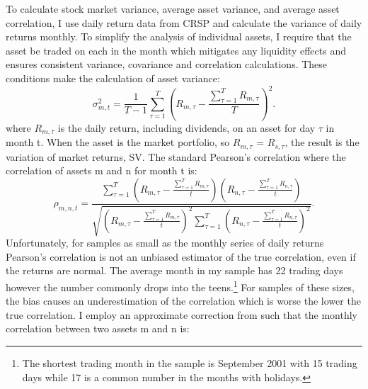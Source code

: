 To calculate stock market variance, average asset variance, and average asset correlation, I use daily return data from CRSP and calculate the variance of daily returns monthly. To simplify the analysis of individual assets, I require that the asset be traded on each in the month which mitigates any liquidity effects and ensures consistent variance, covariance and correlation calculations. These conditions make the calculation of asset variance:
\begin{equation}
	\sigma^{2}_{m,t} = \frac{1}{T-1}\sum_{\tau = 1}^{T} \left(R_{m,\tau} - \frac{\sum_{\tau = 1}^{T} R_{m,\tau}}{T}\right)^{2}.
\end{equation}
where $R_{m,\tau}$ is the daily return, including dividends, on an asset for day $\tau$ in month t. When the asset is the market portfolio, so $R_{m,\tau}$ = $R_{s,\tau}$, the result is the variation of market returns, SV. The standard Pearson’s correlation where the correlation of assets m and n for month t is:
\begin{equation}
	\rho_{m,n,t} = \frac{\sum^{T}_{\tau = 1}\left(R_{m,\tau} - \frac{\sum_{\tau = 1}^{T} R_{m,\tau}}{t}\right)\left(R_{n,\tau} - \frac{\sum_{\tau = 1}^{T} R_{n,\tau}}{t}\right)}{\sqrt{\left(R_{m,\tau} - \frac{\sum_{\tau = 1}^{T} R_{m,\tau}}{t}\right)^{2}\sum_{\tau=1}^{T}\left(R_{n,\tau} - \frac{\sum_{\tau = 1}^{T} R_{n,\tau}}{t}\right)^{2} }}.
\end{equation}
Unfortunately, for samples as small as the monthly series of daily returns Pearson’s correlation is not an unbiased estimator of the true correlation, even if the returns are normal. \cite{hotelling_1953} The average month in my sample has 22 trading days however the number commonly drops into the teens.\footnote{The shortest trading month in the sample is September 2001 with 15 trading days while 17 is a common number in the months with holidays.} For samples of these sizes, the bias causes an underestimation of the correlation which is worse the lower the true correlation. I employ an approximate correction from \cite{olkin_1958} such that the monthly correlation between two assets m and n is:
